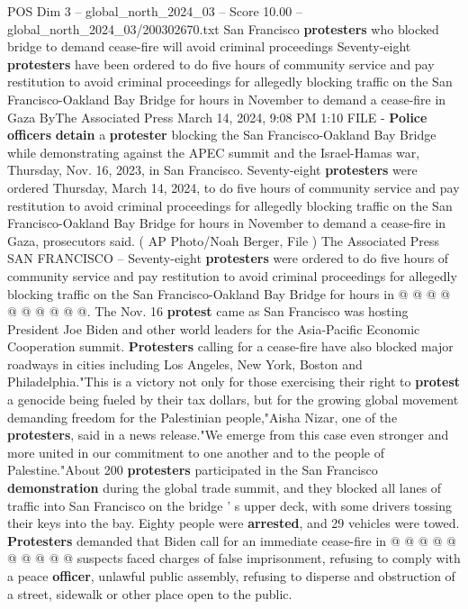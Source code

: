 \begin{textsample}{POS Dim 3 – global\_north\_2024\_03 – Score 10.00 – global\_north\_2024\_03/200302670.txt}  \label{ex:f3_pos_277}
San Francisco \textbf{protesters} who blocked bridge to demand cease-fire will avoid criminal proceedings Seventy-eight \textbf{protesters} have been ordered to do five hours of community service and pay restitution to avoid criminal proceedings for allegedly blocking traffic on the San Francisco-Oakland Bay Bridge for hours in November to demand a cease-fire in Gaza ByThe Associated Press March 14, 2024, 9:08 PM 1:10 FILE - \textbf{Police} \textbf{officers} \textbf{detain} a \textbf{protester} blocking the San Francisco-Oakland Bay Bridge while demonstrating against the APEC summit and the Israel-Hamas war, Thursday, Nov. 16, 2023, in San Francisco.
Seventy-eight \textbf{protesters} were ordered Thursday, March 14, 2024, to do five hours of community service and pay restitution to avoid criminal proceedings for allegedly blocking traffic on the San Francisco-Oakland Bay Bridge for hours in November to demand a cease-fire in Gaza, prosecutors said. ( AP Photo/Noah Berger, File ) The Associated Press SAN FRANCISCO -- Seventy-eight \textbf{protesters} were ordered to do five hours of community service and pay restitution to avoid criminal proceedings for allegedly blocking traffic on the San Francisco-Oakland Bay Bridge for hours in @ @ @ @ @ @ @ @ @ @.
The Nov. 16 \textbf{protest} came as San Francisco was hosting President Joe Biden and other world leaders for the Asia-Pacific Economic Cooperation summit. \textbf{Protesters} calling for a cease-fire have also blocked major roadways in cities including Los Angeles, New York, Boston and Philadelphia."This is a victory not only for those exercising their right to \textbf{protest} a genocide being fueled by their tax dollars, but for the growing global movement demanding freedom for the Palestinian people,"Aisha Nizar, one of the \textbf{protesters}, said in a news release."We emerge from this case even stronger and more united in our commitment to one another and to the people of Palestine."About 200 \textbf{protesters} participated in the San Francisco \textbf{demonstration} during the global trade summit, and they blocked all lanes of traffic into San Francisco on the bridge ' s upper deck, with some drivers tossing their keys into the bay.
Eighty people were \textbf{arrested}, and 29 vehicles were towed. \textbf{Protesters} demanded that Biden call for an immediate cease-fire in @ @ @ @ @ @ @ @ @ @ suspects faced charges of false imprisonment, refusing to comply with a peace \textbf{officer}, unlawful public assembly, refusing to disperse and obstruction of a street, sidewalk or other place open to the public.

\end{textsample}
